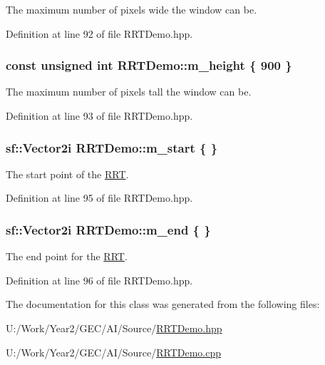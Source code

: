The maximum number of pixels wide the window can be. 



Definition at line 92 of file R\+R\+T\+Demo.\+hpp.

\hypertarget{classRRTDemo_aa9ace790edf95dc62c2b77e3ba5e567b}{
\subsubsection[{m\+\_\+height}]{\setlength{\rightskip}{0pt plus 5cm}const unsigned int R\+R\+T\+Demo\+::m\+\_\+height \{ 900 \}\hspace{0.3cm}{\ttfamily [private]}}}\label{classRRTDemo_aa9ace790edf95dc62c2b77e3ba5e567b}


The maximum number of pixels tall the window can be. 



Definition at line 93 of file R\+R\+T\+Demo.\+hpp.

\hypertarget{classRRTDemo_ae776d26c1d8b700c878a572c6dcaa4c5}{
\subsubsection[{m\+\_\+start}]{\setlength{\rightskip}{0pt plus 5cm}sf\+::\+Vector2i R\+R\+T\+Demo\+::m\+\_\+start \{ \}\hspace{0.3cm}{\ttfamily [private]}}}\label{classRRTDemo_ae776d26c1d8b700c878a572c6dcaa4c5}


The start point of the \hyperlink{classRRT}{R\+R\+T}. 



Definition at line 95 of file R\+R\+T\+Demo.\+hpp.

\hypertarget{classRRTDemo_a96344c80393991da942b99d30308a3da}{
\subsubsection[{m\+\_\+end}]{\setlength{\rightskip}{0pt plus 5cm}sf\+::\+Vector2i R\+R\+T\+Demo\+::m\+\_\+end \{ \}\hspace{0.3cm}{\ttfamily [private]}}}\label{classRRTDemo_a96344c80393991da942b99d30308a3da}


The end point for the \hyperlink{classRRT}{R\+R\+T}. 



Definition at line 96 of file R\+R\+T\+Demo.\+hpp.



The documentation for this class was generated from the following files\+:\begin{DoxyCompactItemize}
\item 
U\+:/\+Work/\+Year2/\+G\+E\+C/\+A\+I/\+Source/\hyperlink{RRTDemo_8hpp}{R\+R\+T\+Demo.\+hpp}\item 
U\+:/\+Work/\+Year2/\+G\+E\+C/\+A\+I/\+Source/\hyperlink{RRTDemo_8cpp}{R\+R\+T\+Demo.\+cpp}\end{DoxyCompactItemize}
